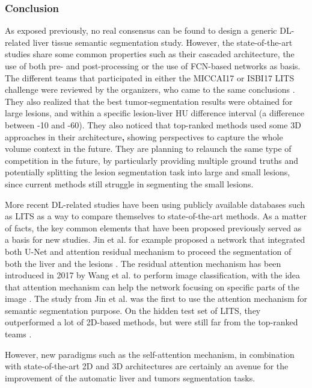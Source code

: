\documentclass[]{article}
\begin{document}
	\subsubsection*{Conclusion}
	
	As exposed previously, no real consensus can be found to design a
	generic DL-related liver tissue semantic segmentation study. However,
	the state-of-the-art studies share some common properties such as their
	cascaded architecture, the use of both pre- and post-processing or the
	use of FCN-based networks as basis.
	The different teams that participated in either the MICCAI17 or ISBI17
	LITS challenge were reviewed by the organizers, who came to the same
	conclusions \cite{Bilic2019}.
	They also realized that the best tumor-segmentation results were
	obtained for large lesions, and within a specific lesion-liver HU
	difference interval (a difference between -10 and -60).
	They also noticed that top-ranked methods used some 3D approaches in
	their architecture\textbf{,} showing perspectives to capture the whole
	volume context in the future. They are planning to relaunch the same
	type of competition in the future, by particularly providing multiple
	ground truths and potentially splitting the lesion segmentation task
	into large and small lesions, since current methods still struggle in
	segmenting the small lesions.
	
	More recent DL-related studies have been using publicly available
	databases such as LITS as a way to compare themselves to
	state-of-the-art methods. As a matter of facts, the key common elements
	that have been proposed previously served as a basis for new studies.
	Jin et al. for example proposed a network that
	integrated both U-Net and attention residual mechanism to proceed the
	segmentation of both the liver and the lesions \cite{Jin2018}.
	The residual attention mechanism has been introduced in 2017 by Wang et al. to perform image classification, with the idea that attention mechanism
	can help the network focusing on specific parts of the image \cite{Wang2017}.
	The study from Jin et al. was the first to use the attention mechanism
	for semantic segmentation purpose. On the hidden test set of LITS, they
	outperformed a lot of 2D-based methods, but were still far from the
	top-ranked teams \cite{Jin2018}.
	
	However, new paradigms such as the self-attention mechanism, in
	combination with state-of-the-art 2D and 3D architectures are certainly
	an avenue for the improvement of the automatic liver and tumors
	segmentation tasks.
	
\end{document}
